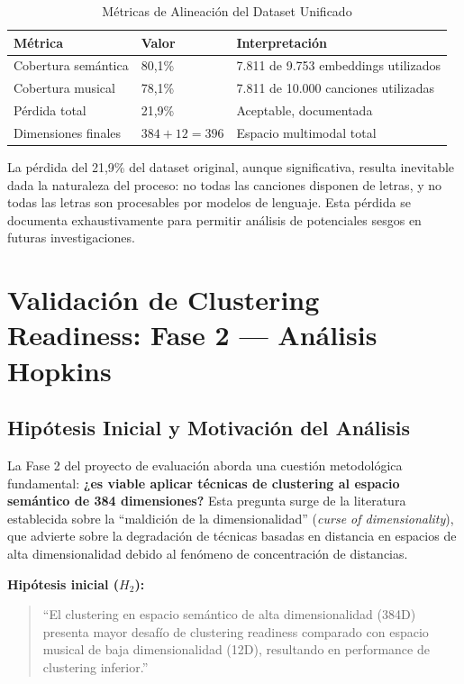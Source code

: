 \begin{table}[htbp]
\centering
\caption{Métricas de Alineación del Dataset Unificado}
\label{tab:metricas-alineacion}
\begin{tabular}{lll}
\toprule
\textbf{Métrica} & \textbf{Valor} & \textbf{Interpretación} \\
\midrule
Cobertura semántica & 80,1\% & 7.811 de 9.753 embeddings utilizados \\
Cobertura musical & 78,1\% & 7.811 de 10.000 canciones utilizadas \\
Pérdida total & 21,9\% & Aceptable, documentada \\
Dimensiones finales & $384 + 12 = 396$ & Espacio multimodal total \\
\bottomrule
\end{tabular}
\end{table}

La pérdida del 21,9\% del dataset original, aunque significativa, resulta inevitable dada la naturaleza del proceso: no todas las canciones disponen de letras, y no todas las letras son procesables por modelos de lenguaje. Esta pérdida se documenta exhaustivamente para permitir análisis de potenciales sesgos en futuras investigaciones.

\section{Validación de Clustering Readiness: Fase 2 --- Análisis Hopkins}
\label{sec:hopkins}

\subsection{Hipótesis Inicial y Motivación del Análisis}
\label{subsec:hipotesis-hopkins}

La Fase 2 del proyecto de evaluación aborda una cuestión metodológica fundamental: \textbf{¿es viable aplicar técnicas de clustering al espacio semántico de 384 dimensiones?} Esta pregunta surge de la literatura establecida sobre la ``maldición de la dimensionalidad'' (\textit{curse of dimensionality}), que advierte sobre la degradación de técnicas basadas en distancia en espacios de alta dimensionalidad debido al fenómeno de concentración de distancias.

\textbf{Hipótesis inicial ($H_2$):}
\begin{quote}
``El clustering en espacio semántico de alta dimensionalidad (384D) presenta mayor desafío de clustering readiness comparado con espacio musical de baja dimensionalidad (12D), resultando en performance de clustering inferior.''
\end{quote}

